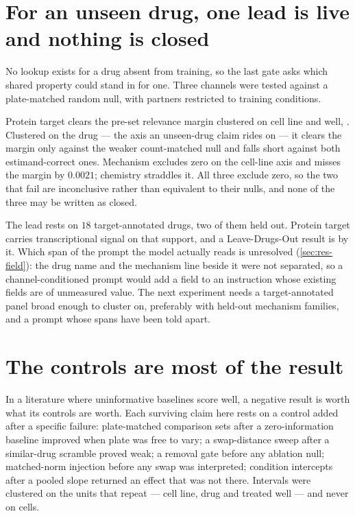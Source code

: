 \section{For an unseen drug, one lead is live and nothing is closed}

No lookup exists for a drug absent from training, so the last gate asks which
shared property could stand in for one. Three channels were tested against a
plate-matched random null, with partners restricted to training conditions.

Protein target clears the pre-set relevance margin clustered on cell line and
well, . Clustered on the drug --- the axis an
unseen-drug claim rides on --- it clears the margin only against the weaker
count-matched null and falls short against both estimand-correct ones. Mechanism
excludes zero on the cell-line axis and misses the margin by $0.0021$; chemistry
straddles it. All three exclude zero, so the two that fail are inconclusive
rather than equivalent to their nulls, and none of the three may be written as
closed.

The lead rests on $18$ target-annotated drugs, two of them held out. Protein
target carries transcriptional signal on that support, and a Leave-Drugs-Out
result is \notestablished by it. Which span of the prompt the model actually
reads is unresolved (\cref{sec:res-field}): the drug name and the mechanism line
beside it were not separated, so a channel-conditioned prompt would add a field
to an instruction whose existing fields are of unmeasured value. The next
experiment needs a target-annotated panel broad enough to cluster on, preferably
with held-out mechanism families, and a prompt whose spans have been told
apart.

\section{The controls are most of the result}

In a literature where uninformative baselines score well, a negative result is
worth what its controls are worth. Each surviving claim here rests on a control
added after a specific failure: plate-matched comparison sets after a
zero-information baseline improved when plate was free to vary; a swap-distance
sweep after a similar-drug scramble proved weak; a removal gate before any
ablation null; matched-norm injection before any swap was interpreted; condition
intercepts after a pooled slope returned an effect that was not there. Intervals
were clustered on the units that repeat --- cell line, drug and treated well ---
and never on cells.

